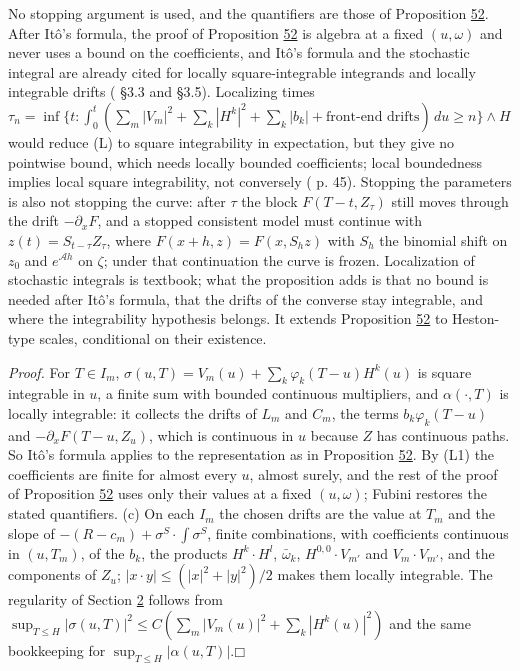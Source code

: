 \documentclass[11pt]{article}
\providecommand{\square}{\mdlgwhtsquare}
\begin{document}
No stopping argument is used, and the quantifiers are those of Proposition \hyperref[res:Proposition-52]{52}. After Itô's formula, the proof of Proposition \hyperref[res:Proposition-52]{52} is algebra at a fixed \((u,\omega)\) and never uses a bound on the coefficients, and Itô's formula and the stochastic integral are already cited for locally square-integrable integrands and locally integrable drifts (\cite{bauerschmidt2020stochastic} §3.3 and §3.5). Localizing times \(\tau_n=\inf\{t:\int_0^t(\sum_m|V_m|^2+\sum_k|H^k|^2+\sum_k|b_k|+\text{front-end drifts})\,du\ge n\}\wedge H\) would reduce (L) to square integrability in expectation, but they give no pointwise bound, which needs locally bounded coefficients; local boundedness implies local square integrability, not conversely (\cite{bauerschmidt2020stochastic} p. 45). Stopping the parameters is also not stopping the curve: after \(\tau\) the block \(F(T-t,Z_\tau)\) still moves through the drift \(-\partial_xF\), and a stopped consistent model must continue with \(z(t)=S_{t-\tau}Z_\tau\), where \(F(x+h,z)=F(x,S_hz)\) with \(S_h\) the binomial shift on \(z_0\) and \(e^{\mathcal Ah}\) on \(\zeta\); under that continuation the curve is frozen. Localization of stochastic integrals is textbook; what the proposition adds is that no bound is needed after Itô's formula, that the drifts of the converse stay integrable, and where the integrability hypothesis belongs. It extends Proposition \hyperref[res:Proposition-52]{52} to Heston-type scales, conditional on their existence.

\emph{Proof.} For \(T\in I_m\), \(\sigma(u,T)=V_m(u)+\sum_k\varphi_k(T-u)H^k(u)\) is square integrable in \(u\), a finite sum with bounded continuous multipliers, and \(\alpha(\cdot,T)\) is locally integrable: it collects the drifts of \(L_m\) and \(C_m\), the terms \(b_k\varphi_k(T-u)\) and \(-\partial_xF(T-u,Z_u)\), which is continuous in \(u\) because \(Z\) has continuous paths. So Itô's formula applies to the representation as in Proposition \hyperref[res:Proposition-52]{52}. By (L1) the coefficients are finite for almost every \(u\), almost surely, and the rest of the proof of Proposition \hyperref[res:Proposition-52]{52} uses only their values at a fixed \((u,\omega)\); Fubini restores the stated quantifiers. (c) On each \(I_m\) the chosen drifts are the value at \(T_m\) and the slope of \(-(R-c_m)+\sigma^S\cdot\int\sigma^S\), finite combinations, with coefficients continuous in \((u,T_m)\), of the \(b_k\), the products \(H^k\cdot H^l\), \(\bar\omega_k\), \(H^{0,0}\cdot V_{m'}\) and \(V_m\cdot V_{m'}\), and the components of \(Z_u\); \(|x\cdot y|\le(|x|^2+|y|^2)/2\) makes them locally integrable. The regularity of Section \hyperref[sec:2]{2} follows from \(\sup_{T\le H}|\sigma(u,T)|^2\le C(\sum_m|V_m(u)|^2+\sum_k|H^k(u)|^2)\) and the same bookkeeping for \(\sup_{T\le H}|\alpha(u,T)|\).\hfill$\square$
\end{document}
